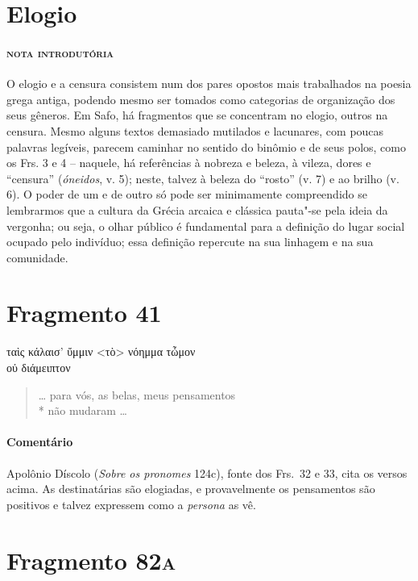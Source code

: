 \pagebreak
\section{Elogio}

\paragraph{\textsc{nota introdutória}}
O elogio e a censura consistem num dos pares opostos mais trabalhados na poesia
grega antiga, podendo mesmo ser tomados como categorias de organização dos seus gêneros.
Em Safo, há fragmentos que se concentram no
elogio, outros na
censura. Mesmo alguns textos demasiado mutilados e lacunares, com poucas palavras legíveis, parecem caminhar no sentido do binômio e de seus polos, como os Frs. 3 e 4 -- naquele, há referências à nobreza e beleza, à vileza, dores e ``censura'' (\textit{óneidos}, v. 5); neste, talvez à beleza do ``rosto'' (v. 7) e ao brilho (v. 6). O poder de um e de outro só pode ser
minimamente compreendido se lembrarmos que a cultura da Grécia arcaica e
clássica pauta"-se pela ideia da vergonha; ou seja, o olhar público é
fundamental para a definição do lugar social ocupado pelo indivíduo; essa
definição repercute na sua linhagem e na sua comunidade. 

\section{Fragmento 41}

\begin{gkverse}
ταὶς κάλαισ’ ὔμμιν <τὸ> νόημμα τὦμον\\
       οὐ διάμειπτον
\end{gkverse}

\begin{verse}
\ldots{} para vós, as belas, meus pensamentos\\*
não mudaram \ldots{}
\end{verse}

{\paragraph{Comentário} Apolônio Díscolo (\textit{Sobre os pronomes} 124c), fonte dos Frs.~32 e 33, cita os versos acima.
As destinatárias são elogiadas, e provavelmente os pensamentos são positivos e talvez expressem como a \textit{persona} as vê.}


\pagebreak
\section{Fragmento 82\textsc{a}}

